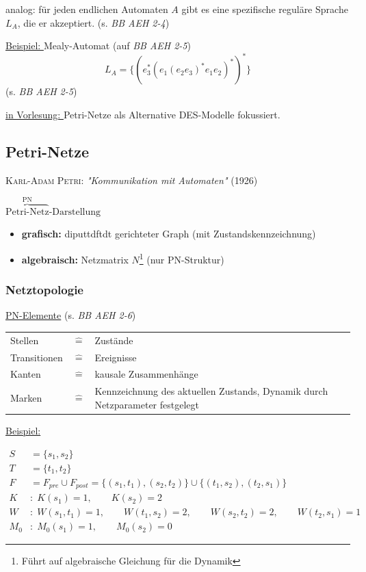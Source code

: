 \documentclass[12pt,a4paper]{scrartcl}
\numberwithin{equation}{section}
\begin{document}

analog: für jeden endlichen Automaten $A$ gibt es eine spezifische reguläre Sprache $L_A$, die er akzeptiert. (s. \textit{BB AEH 2-4})

\underline{Beispiel: } Mealy-Automat (auf \textit{BB AEH 2-5})
\begin{equation}
	L_A = \{ (e_3^{\ast}(e_1 (e_2 e_3)^{\ast} e_1 e_2)^{\ast})^{\ast} \}
\end{equation}
(s. \textit{BB AEH 2-5})

\underline{in Vorlesung: } Petri-Netze als Alternative DES-Modelle fokussiert.

\subsection{Petri-Netze}
\textsc{Karl-Adam Petri}: \textit{"Kommunikation mit Automaten"} (1926)

\underline{$\overbrace{\text{Petri-Netz}}^{\text{PN}}\text{-Darstellung}$}

\begin{itemize}
	\item \textbf{grafisch:} diputtdftdt gerichteter Graph (mit Zustandskennzeichnung)
	\item \textbf{algebraisch:} Netzmatrix $N$\footnote{Führt auf algebraische Gleichung für die Dynamik} (nur PN-Struktur) 
\end{itemize}

\subsubsection{Netztopologie}

\underline{PN-Elemente} (s. \textit{BB AEH 2-6})

\begin{tabularx}{0.9\linewidth}{p{2.1cm}p{0.1cm}X}
	Stellen & $\mathrel{\hat{=}}$ & Zustände \\
	Transitionen & $\mathrel{\hat{=}}$ & Ereignisse \\
	Kanten & $\mathrel{\hat{=}}$ & kausale Zusammenhänge \\
	Marken & $\mathrel{\hat{=}}$ & Kennzeichnung des aktuellen Zustands, Dynamik durch Netzparameter festgelegt \\
\end{tabularx}

\underline{Beispiel:}


\begin{subequations}
	\begin{align}
	S &= \{ s_1, s_2 \} \\
	T &= \{ t_1, t_2 \} \\
	F &= F_{pre} \cup F_{post} = \{ (s_1, t_1), (s_2,t_2) \} \cup \{(t_1, s_2), (t_2, s_1) \} \\
	K&:\; K(s_1)=1, \qquad K(s_2)=2 \\
	W&:\; W(s_1,t_1)=1, \qquad W(t_1,s_2)=2, \qquad W(s_2,t_2)=2, \qquad W(t_2,s_1)=1 \\
	M_0&:\; M_0(s_1)=1, \qquad M_0(s_2)=0
	\end{align}
\end{subequations}
\end{document}
